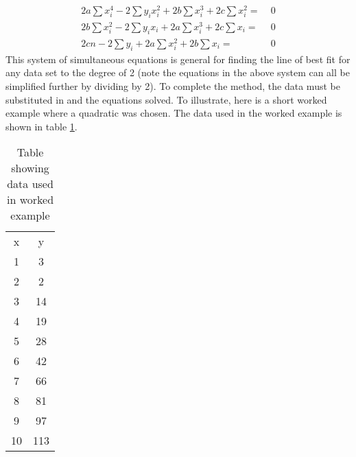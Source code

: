 \documentclass{article}
\begin{document}
\begin{align*}
    2a \sum x_i^4 -2\sum y_ix_i^2 + 2b \sum x_i^3 + 2c \sum x_i^2 =& \; 0 \\
    2b \sum x_i^2 - 2 \sum y_i x_i + 2a \sum  x_i^3 + 2c \sum x_i =& \; 0 \\
    2cn - 2\sum y_i + 2a\sum x_i^2 + 2b \sum x_i =& \; 0
\end{align*}
This system of simultaneous equations is general for finding the line of best fit for any data set to the degree of 2 (note the equations in the above system can all be simplified further by dividing by 2). To complete the method, the data must be substituted in and the equations solved.
To illustrate, here is a short worked example where a quadratic was chosen. The data used in the worked example is shown in table \ref{table:2}.
\begin{table}[h!]
\begin{center}
\begin{tabular}{ |c|c| } 
 \hline
 x & y  \\ 
 1 & 3  \\ 
 2 & 2  \\
 3 & 14 \\
 4 & 19 \\
 5 & 28 \\
 6 & 42 \\
 7 & 66 \\
 8 & 81 \\
 9 & 97 \\
 10 & 113 \\
 \hline
\end{tabular}
\end{center}
\caption{Table showing data used in worked example}
\label{table:2}
\end{table}
\end{document}
